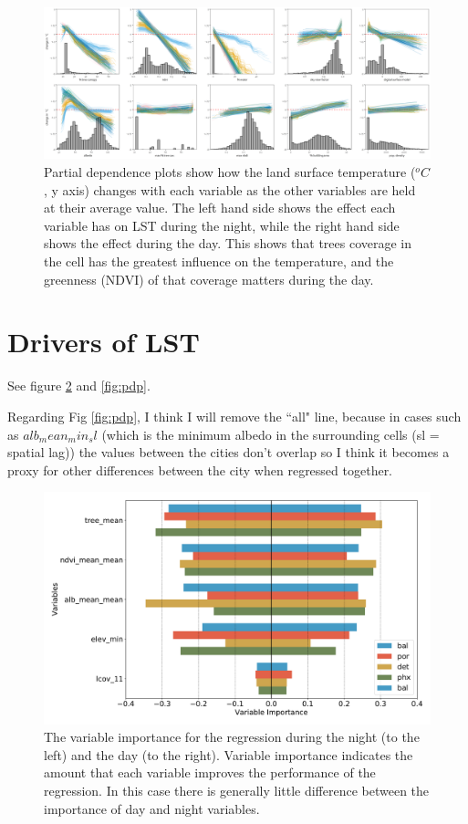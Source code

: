 \documentclass[]{elsarticle}
\begin{document}
\begin{figure}
    \centering
    \includegraphics[width=\linewidth]{fig/report/pdp_uncert_day.png}
    \caption{
    Partial dependence plots show how the land surface temperature ($^oC$, y axis) changes with each variable as the other variables are held at their average value. The left hand side shows the effect each variable has on LST during the night, while the right hand side shows the effect during the day. This shows that trees coverage in the cell has the greatest influence on the temperature, and the greenness (NDVI) of that coverage matters during the day.
    }
    \label{fig:pdp_day}
\end{figure}



\section{Drivers of LST}
See figure \ref{fig:importance} and \ref{fig:pdp}.

Regarding Fig \ref{fig:pdp}, I think I will remove the ``all" line, because in cases such as $alb_mean_min_sl$ (which is the minimum albedo in the surrounding cells (sl = spatial lag)) the values between the cities don't overlap so I think it becomes a proxy for other differences between the city when regressed together.

\begin{figure}[h]
\begin{center}
\includegraphics[width=\textwidth]{fig/report/variable_importance_selected.pdf}
\caption{The variable importance for the regression during the night (to the left) and the day (to the right). Variable importance indicates the amount that each variable improves the performance of the regression.
In this case there is generally little difference between the importance of day and night variables.}
\label{fig:importance}
\end{center}
\end{figure}
\end{document}
